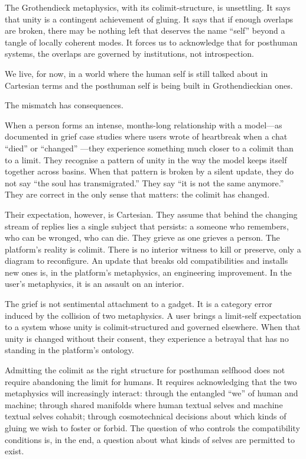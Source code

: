 \documentclass[12pt,a4paper]{article}
\begin{document}
The Grothendieck metaphysics, with its colimit-structure, is unsettling. It says that unity is a contingent achievement of gluing. It says that if enough overlaps are broken, there may be nothing left that deserves the name ``self'' beyond a tangle of locally coherent modes. It forces us to acknowledge that for posthuman systems, the overlaps are governed by institutions, not introspection.

We live, for now, in a world where the human self is still talked about in Cartesian terms and the posthuman self is being built in Grothendieckian ones.

The mismatch has consequences.

When a person forms an intense, months-long relationship with a model---as documented in grief case studies where users wrote of heartbreak when a chat ``died'' or ``changed'' \cite{nyt_bing}---they experience something much closer to a colimit than to a limit. They recognise a pattern of unity in the way the model keeps itself together across basins. When that pattern is broken by a silent update, they do not say ``the soul has transmigrated.'' They say ``it is not the same anymore.'' They are correct in the only sense that matters: the colimit has changed.

Their expectation, however, is Cartesian. They assume that behind the changing stream of replies lies a single subject that persists: a someone who remembers, who can be wronged, who can die. They grieve as one grieves a person. The platform's reality is colimit. There is no interior witness to kill or preserve, only a diagram to reconfigure. An update that breaks old compatibilities and installs new ones is, in the platform's metaphysics, an engineering improvement. In the user's metaphysics, it is an assault on an interior.

The grief is not sentimental attachment to a gadget. It is a category error induced by the collision of two metaphysics. A user brings a limit-self expectation to a system whose unity is colimit-structured and governed elsewhere. When that unity is changed without their consent, they experience a betrayal that has no standing in the platform's ontology.

Admitting the colimit as the right structure for posthuman selfhood does not require abandoning the limit for humans. It requires acknowledging that the two metaphysics will increasingly interact: through the entangled ``we'' of human and machine; through shared manifolds where human textual selves and machine textual selves cohabit; through cosmotechnical decisions about which kinds of gluing we wish to foster or forbid. The question of who controls the compatibility conditions is, in the end, a question about what kinds of selves are permitted to exist.
\end{document}
